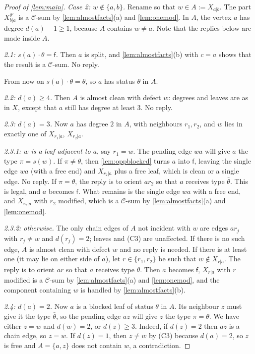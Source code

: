 \documentclass[11pt]{amsart}
\theoremstyle{definition}
\theoremstyle{remark}
\newcommand{\sff}{\mathsf{f}}
\begin{document}
\begin{proof}[Proof of \cref{lem:main}]
\smallskip\noindent\emph{Case 2: $w\notin\{a,b\}$.} Rename so that $w\in A:=X_{a|b}$. The part
$X_{b|a}^{\theta'}$ is a $\mathcal C$-sum by \cref{lem:almostfacts}(a) and \cref{lem:onemod}. In
$A$, the vertex $a$ has degree $d(a)-1\ge1$, because $A$ contains $w\neq a$. Note that the
replies below are made inside $A$.

\emph{2.1: $s(a)\cdot\theta=\sff$.} Then $a$ is split, and \cref{lem:almostfacts}(b) with $c=a$
shows that the result is a $\mathcal C$-sum. No reply.

From now on $s(a)\cdot\theta=\theta$, so $a$ has status $\theta$ in $A$.

\emph{2.2: $d(a)\ge4$.} Then $A$ is almost clean with defect $w$: degrees and leaves are as in $X$,
except that $a$ still has degree at least $3$. No reply.

\emph{2.3: $d(a)=3$.} Now $a$ has degree $2$ in $A$, with neighbours $r_1,r_2$, and $w$ lies in
exactly one of $X_{r_1|a}$, $X_{r_2|a}$.

\emph{2.3.1: $w$ is a leaf adjacent to $a$}, say $r_1=w$. The pending edge $wa$ will give $a$ the
type $\pi=s(w)$. If $\pi\ne\theta$, then \cref{lem:oppblocked} turns $a$ into $\sff$, leaving the
single edge $wa$ (with a free end) and $X_{r_2|a}$ plus a free leaf, which is clean or a single edge. No reply.
If $\pi=\theta$, the reply is to orient $ar_2$ so that $a$ receives type $\bar\theta$. This is legal,
and $a$ becomes $\sff$. What remains is the single edge $wa$ with a free end, and $X_{r_2|a}$ with
$r_2$ modified, which is a $\mathcal C$-sum by \cref{lem:almostfacts}(a) and \cref{lem:onemod}.

\emph{2.3.2: otherwise.} The only chain edges of $A$ not incident with $w$ are edges $ar_j$ with
$r_j\ne w$ and $d(r_j)=2$; leaves and (C3) are unaffected. If there is no such edge, $A$ is almost
clean with defect $w$ and no reply is needed. If there is at least one (it may lie on either side of $a$), let $r\in\{r_1,r_2\}$ be such that
$w\notin X_{r|a}$. The reply is to orient $ar$ so that $a$ receives type $\bar\theta$. Then $a$
becomes $\sff$, $X_{r|a}$ with $r$ modified is a $\mathcal C$-sum by \cref{lem:almostfacts}(a) and
\cref{lem:onemod}, and the component containing $w$ is handled by \cref{lem:almostfacts}(b).

\emph{2.4: $d(a)=2$.} Now $a$ is a blocked leaf of status $\theta$ in $A$. Its neighbour $z$ must
give it the type $\bar\theta$, so the pending edge $az$ will give $z$ the type $\pi=\theta$. We
have either $z=w$ and $d(w)=2$, or $d(z)\ge3$. Indeed, if $d(z)=2$ then $az$ is a chain edge, so
$z=w$. If $d(z)=1$, then $z\ne w$ by (C3) because $d(a)=2$, so $z$ is free and $A=\{a,z\}$ does not
contain $w$, a contradiction.


\end{proof}
\end{document}
